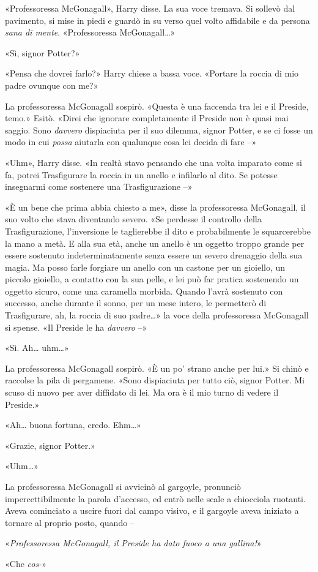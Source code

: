 «Professoressa McGonagall», Harry disse. La sua voce tremava. Si sollevò dal pavimento, si mise in piedi e guardò in su verso quel volto affidabile e da persona \textit{sana di mente}. «Professoressa McGonagall…»

«Sì, signor Potter?»

«Pensa che dovrei farlo?» Harry chiese a bassa voce. «Portare la roccia di mio padre ovunque con me?»

La professoressa McGonagall sospirò. «Questa è una faccenda tra lei e il Preside, temo.» Esitò. «Direi che ignorare completamente il Preside non è quasi mai saggio. Sono \textit{davvero} dispiaciuta per il suo dilemma, signor Potter, e se ci fosse un modo in cui \textit{possa} aiutarla con qualunque cosa lei decida di fare –»

«Uhm», Harry disse. «In realtà stavo pensando che una volta imparato come si fa, potrei Trasfigurare la roccia in un anello e infilarlo al dito. Se potesse insegnarmi come sostenere una Trasfigurazione –»

«È un bene che prima abbia chiesto a me», disse la professoressa McGonagall, il suo volto che stava diventando severo. «Se perdesse il controllo della Trasfigurazione, l’inversione le taglierebbe il dito e probabilmente le squarcerebbe la mano a metà. E alla sua età, anche un anello è un oggetto troppo grande per essere sostenuto indeterminatamente senza essere un severo drenaggio della sua magia. Ma posso farle forgiare un anello con un castone per un gioiello, un piccolo gioiello, a contatto con la sua pelle, e lei può far pratica sostenendo un oggetto sicuro, come una caramella morbida. Quando l’avrà sostenuto con successo, anche durante il sonno, per un mese intero, le permetterò di Trasfigurare, ah, la roccia di suo padre…» la voce della professoressa McGonagall si spense. «Il Preside le ha \textit{davvero} –»

«Sì. Ah… uhm…»

La professoressa McGonagall sospirò. «È un po’ strano anche per lui.» Si chinò e raccolse la pila di pergamene. «Sono dispiaciuta per tutto ciò, signor Potter. Mi scuso di nuovo per aver diffidato di lei. Ma ora è il mio turno di vedere il Preside.»

«Ah… buona fortuna, credo. Ehm…»

«Grazie, signor Potter.»

«Uhm…»

La professoressa McGonagall si avvicinò al gargoyle, pronunciò impercettibilmente la parola d’accesso, ed entrò nelle scale a chiocciola ruotanti. Aveva cominciato a uscire fuori dal campo visivo, e il gargoyle aveva iniziato a tornare al proprio posto, quando –

«\textit{Professoressa McGonagall, il Preside ha dato fuoco a una gallina!}»

«Che \textit{cos-}»



